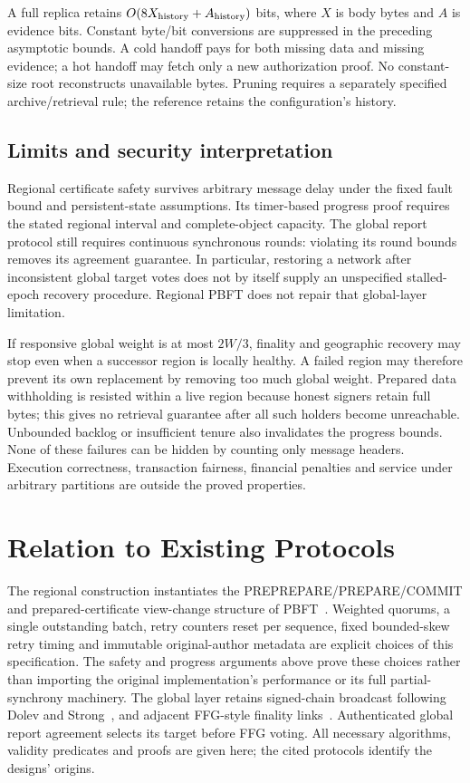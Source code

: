 \documentclass[11pt,a4paper,onecolumn]{article}
\theoremstyle{remark}\newtheorem{example}[definition]{Example}
\newcounter{protocol}
\begin{document}
A full replica retains $O(8X_{\rm history}+A_{\rm history})$ bits, where $X$ is
body bytes and $A$ is evidence bits. Constant byte/bit conversions are suppressed
in the preceding asymptotic bounds. A cold handoff pays for
both missing data and missing evidence; a hot handoff may fetch only a new
authorization proof. No constant-size root reconstructs unavailable bytes.
Pruning requires a separately specified archive/retrieval rule; the reference
retains the configuration's history.


\subsection{Limits and security interpretation}\label{sec:limits}
Regional certificate safety survives arbitrary message delay under the fixed
fault bound and persistent-state assumptions. Its timer-based progress proof
requires the stated regional interval and complete-object capacity. The global
report protocol still requires continuous synchronous rounds: violating its
round bounds removes its agreement guarantee. In particular, restoring a
network after inconsistent global target votes does not by itself supply an
unspecified stalled-epoch recovery procedure. Regional PBFT does not repair
that global-layer limitation.

If responsive global weight is at most $2W/3$, finality and geographic recovery
may stop even when a successor region is locally healthy. A failed region may
therefore prevent its own replacement by removing too much global weight.
Prepared data withholding is resisted within a live region because honest
signers retain full bytes; this gives no retrieval guarantee after all such
holders become unreachable. Unbounded backlog or insufficient tenure also
invalidates the progress bounds. None of these failures can be hidden by
counting only message headers. Execution correctness, transaction fairness,
financial penalties and service under arbitrary partitions are outside the
proved properties.

\section*{Relation to Existing Protocols}
The regional construction instantiates the PREPREPARE/PREPARE/COMMIT and
prepared-certificate view-change structure of PBFT~\cite{pbft}. Weighted
quorums, a single outstanding batch, retry counters reset per sequence, fixed
bounded-skew retry timing and immutable original-author metadata are explicit
choices of this specification. The safety and progress arguments above prove
these choices rather than importing the original implementation's performance
or its full partial-synchrony machinery. The global layer retains signed-chain
broadcast following Dolev and Strong~\cite{ds}, and adjacent FFG-style finality
links~\cite{ffg}. Authenticated global report agreement selects its target
before FFG voting. All necessary algorithms, validity predicates and proofs
are given here; the cited protocols identify the designs' origins.
\end{document}

